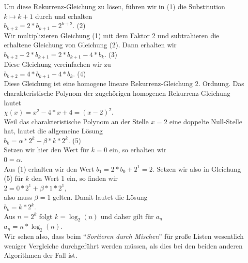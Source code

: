 Um diese Rekurrenz-Gleichung zu l\"osen, f\"uhren wir in (1) die Substitution $k \mapsto k+1$ durch und erhalten \\[0.1cm]
\hspace*{1.3cm}  $b_{k+2} = 2 * b_{k+1} + 2^{k+2}$. \hspace*{\fill} (2) \\[0.1cm]
Wir multiplizieren Gleichung (1) mit dem Faktor 2 und subtrahieren die erhaltene Gleichung von Gleichung (2). 
Dann erhalten wir \\[0.1cm]
\hspace*{1.3cm}  $b_{k+2} - 2 * b_{k+1} = 2 * b_{k+1} - 4 * b_k$. \hspace*{\fill} (3) \\[0.1cm]
Diese Gleichung vereinfachen wir zu \\[0.1cm]
\hspace*{1.3cm}  $b_{k+2} = 4 * b_{k+1} - 4 * b_k$. \hspace*{\fill} (4) \\[0.1cm]
Diese Gleichung ist eine homogene lineare Rekurrenz-Gleichung 2. Ordnung.
Das charakteristische Polynom der zugeh\"origen homogenen Rekurrenz-Gleichung lautet \\[0.1cm]
\hspace*{1.3cm} $\displaystyle \chi(x) = x^2 - 4 *x + 4 = (x-2)^2$. \\[0.1cm]
Weil das charakteristische Polynom an der Stelle $x=2$ eine doppelte Null-Stelle hat, 
lautet die allgemeine L\"osung \\[0.1cm]
\hspace*{1.3cm} $\displaystyle b_k = \alpha * 2^k + \beta * k * 2^k$. \hspace*{\fill} (5) \\[0.1cm]
Setzen wir hier den Wert f\"ur $k=0$ ein, so erhalten wir \\[0.1cm]
\hspace*{1.3cm} $0 = \alpha$. \\[0.1cm]
Aus (1) erhalten wir den Wert $b_1 = 2 * b_0 + 2^1 = 2$.  Setzen wir also in Gleichung (5) f\"ur $k$ den Wert 1 ein, 
so finden wir \\[0.1cm]
\hspace*{1.3cm} $2 = 0 * 2^1 + \beta * 1 * 2^1$,  \\[0.1cm]
also muss $\beta = 1$ gelten.  Damit lautet die L\"osung \\[0.1cm]
\hspace*{1.3cm} $b_k = k * 2^k$. \\[0.1cm]
Aus $n = 2^k$ folgt $k = \log_2(n)$ und daher gilt f\"ur $a_n$ \\[0.1cm]
\hspace*{1.3cm} $a_n = n * \log_2(n)$. \\[0.1cm]
Wir sehen also, dass beim ``\emph{Sortieren durch Mischen}'' f\"ur gro{\ss}e Listen wesentlich weniger Vergleiche
durchgef\"uhrt werden m\"ussen, als dies bei den beiden anderen Algorithmen der Fall ist.

